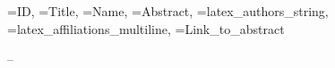 \documentclass[a4paper,12pt]{article}
\begin{document}
\newpage


  {\ID=ID,
  \Title=Title, 
  \Name=Name, 
  \Abstract=Abstract, 
  \Authors=latex_authors_string, 
  \Affiliations=latex_affiliations_multiline,
  \URL=Link_to_abstract}
  {
    \label{abs:\ID}

    \begin{center}
      {\Large \textsc{\Contribution} -- \Title \par}
    \end{center}

    {\noindent \large \Authors \par \vspace{.5em}}

    {\noindent \small \Affiliations \par \vspace{1em}}

    {\noindent \Abstract \par \vspace{1em}}

    {\centering \href{\URL}{\URL} \par}

    \newpage
  }

\end{document}
